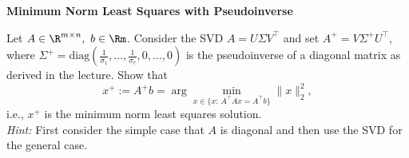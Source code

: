 \textbf{\normalsize Minimum Norm Least Squares with Pseudoinverse}

Let $A\in\R^{m\times n},~b\in\Rm$. Consider the SVD $A = U\Sigma V^\top$ and set $A^+ = V \Sigma^+ U^\top$, where $\Sigma^+ = \text{diag}(\frac{1}{\sigma_1},\ldots, \frac{1}{\sigma_r},0,\ldots,0)$ is the pseudoinverse of a diagonal matrix as derived in the lecture.
Show that $$x^+:=A^+b = \arg \min_{x\in \{x:~A^\top Ax=A^\top b\}} \|x\|_2^2,$$
i.e., $x^+$ is the minimum norm least squares solution.\\
\textit{Hint:} First consider the simple case that $A$ is diagonal and then use the SVD for the general case.
